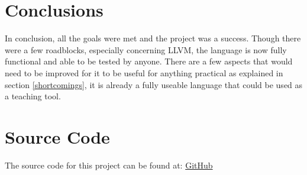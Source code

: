 \documentclass[12pt]{article}
\begin{document}
\section{Conclusions}
In conclusion, all the goals were met and the project was a success.
Though there were a few roadblocks, especially concerning LLVM,
the language is now fully functional and able to be tested by anyone.
There are a few aspects that would need to be improved for it to be
useful for anything practical as explained in section \ref{shortcomings},
it is already a fully useable language that could be used as a teaching
tool.

\newpage
\printbibliography

\lstlistoflistings

\appendix
\section{Source Code}
The source code for this project can be found at: \href{https://github.com/enmiligi/matura-project}{GitHub}
\end{document}
